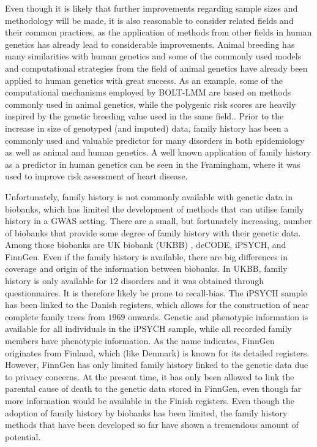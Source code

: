 Even though it is likely that further improvements regarding sample sizes and methodology will be made, it is also reasonable to consider related fields and their common practices, as the application of methods from other fields in human genetics has already lead to considerable improvements. Animal breeding has many similarities with human genetics and some of the commonly used models and computational strategies from the field of animal genetics have already been applied to human genetics with great success. As an example, some of the computational mechanisms employed by BOLT-LMM are based on methods commonly used in animal genetics, while the polygenic risk scores are heavily inspired by the genetic breeding value used in the same field.\cite{loh2015efficient,wray2019complex,meuwissen2001prediction}. Prior to the increase in size of genotyped (and imputed) data, family history has been a commonly used and valuable predictor for many disorders in both epidemiology as well as animal and human genetics\cite{guttmacher2004family,runeson2003family,collaborative2001familial,johns2001systematic}. A well known application of family history as a predictor in human genetics can be seen in the Framingham, where it was used to improve risk assessment of heart disease\cite{kannel1990contribution,splansky2007third}.

Unfortunately, family history is not commonly available with genetic data in biobanks, which has limited the development of methods that can utilise family history in a GWAS setting. There are a small, but fortunately increasing, number of biobanks that provide some degree of family history with their genetic data. Among those biobanks are UK biobank (UKBB) \cite{bycroft2018uk}, deCODE\cite{noauthor_2012-jh}, iPSYCH\cite{bybjerg2020ipsych2015}, and FinnGen\cite{Kurki2022-pt}. Even if the family history is available, there are big differences in coverage and origin of the information between biobanks. In UKBB, family history is only available for $ 12 $ disorders and it was obtained through questionnaires. It is therefore likely be prone to recall-bias. The iPSYCH sample has been linked to the Danish registers, which allows for the construction of near complete family trees from $ 1969 $ onwards. Genetic and phenotypic information is available for all individuals in the iPSYCH sample, while all recorded family members have phenotypic information. As the name indicates, FinnGen originates from Finland, which (like Denmark) is known for its detailed registers. However, FinnGen has only limited family history linked to the genetic data due to privacy concerns. At the present time, it has only been allowed to link the parental cause of death to the genetic data stored in FinnGen, even though far more information would be available in the Finish registers. Even though the adoption of family history by biobanks has been limited, the family history methods that have been developed so far have shown a tremendous amount of potential. 


